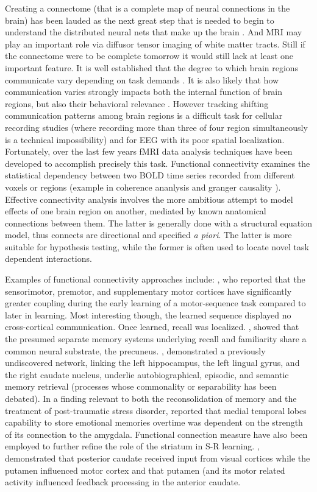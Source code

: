 \documentclass[doc]{apa}        %
\begin{document}
Creating a connectome (that is a complete map of neural connections in the brain) has been lauded as the next great step that is needed to begin to understand the distributed neural nets that make up the brain \cite{sporns:2005aa}.  And MRI may play an important role via diffusor tensor imaging of white matter tracts.  Still if the connectome were to be complete tomorrow it would still lack at least one important feature.  It is well established that the degree to which brain regions communicate vary depending on task demands \cite{Friston:2002p7254}.  It is also likely that how communication varies strongly impacts both the internal function of brain regions, but also their behavioral relevance \cite{Friston:2002p7254,Brezina:2010p7230}.  However tracking shifting communication patterns among brain regions is a difficult task for cellular recording studies (where recording more than three of four region simultaneously is a technical impossibility) and for EEG with its poor spatial localization.  Fortunately, over the last few years fMRI data analysis techniques have been developed to accomplish precisely this task.  Functional connectivity examines the statistical dependency between two BOLD time series recorded from different voxels or regions (example in coherence ananlysis \cite{Sun:2004p2973} and granger causality \cite{Goebel:2003p2019}).   Effective connectivity analysis involves the more ambitious attempt to model effects of one brain region on another, mediated by known anatomical connections between them. The latter is generally done with a structural equation model, thus connects are directional and specified \emph{a piori}.  The latter is more suitable for hypothesis testing, while the former is often used to locate novel task dependent interactions.

Examples of functional connectivity approaches include: , who reported that the sensorimotor, premotor, and supplementary motor cortices have significantly greater coupling during the early learning of a motor-sequence task compared to later in learning.  Most interesting though, the learned sequence displayed no cross-cortical communication.   Once learned, recall was localized. , showed that the presumed separate memory systems underlying recall and familiarity share a common neural substrate, the precuneus. , demonstrated a previously undiscovered network, linking the left hippocampus, the left lingual gyrus, and the right caudate nucleus, underlie autobiographical, episodic, and semantic memory retrieval (processes whose commonality or separability has been debated).  In a finding relevant to both the reconsolidation of memory and the treatment of post-traumatic stress disorder,  reported that medial temporal lobes capability to store emotional memories overtime was dependent on the strength of its connection to the amygdala.  Functional connection measure have also been employed to further refine the role of the striatum in S-R learning.  \cite{Seger:2010p7188}, demonstrated that posterior caudate received input from visual cortices while the putamen influenced motor cortex and that putamen (and its motor related activity influenced feedback processing in the anterior caudate.
\end{document}
